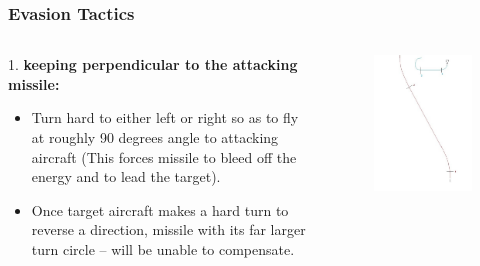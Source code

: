 \documentclass{beamer}
\begin{document}
\begin{frame}
\frametitle{Evasion Tactics}

\begin{columns}[c]
	\begin{column}{.6\linewidth}
	1. \textbf{keeping perpendicular to the attacking missile:}
	\begin{itemize}
		\item Turn hard to either left or right so as to fly at roughly 90 degrees angle to attacking aircraft (This forces missile to bleed off the energy and to lead the target).
		\item Once target aircraft makes a hard turn to reverse a direction, missile with its far larger turn circle – will be unable to compensate.
	\end{itemize}
	\end{column}



	\begin{column}{.3\linewidth}
		\begin{figure}[H]
			\centering
			\includegraphics[scale = 0.25]{fig/evasiontech1.jpg}
		\end{figure}
	\end{column}
\end{columns}
\end{frame}
\end{document}
